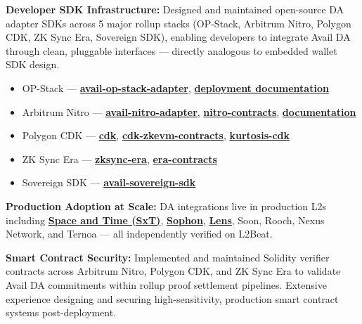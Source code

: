 \documentclass[letterpaper,11pt]{article}
\newcommand{\resumeItem}[1]{
  \item\small{
    {#1 \vspace{-2pt}}
  }
}
\begin{document}
    \resumeItem{\textbf{Developer SDK Infrastructure:} Designed and maintained open-source DA adapter SDKs across 5 major rollup stacks (OP-Stack, Arbitrum Nitro, Polygon CDK, ZK Sync Era, Sovereign SDK), enabling developers to integrate Avail DA through clean, pluggable interfaces — directly analogous to embedded wallet SDK design.
      \begin{itemize}
        \item OP-Stack --- \href{https://github.com/availproject/avail-op-stack-adapter/tree/avail-develop}{\textbf{avail-op-stack-adapter}}, \href{https://docs.availproject.org/docs/build-with-avail/deploy-rollup-on-avail/Optimium/op-stack/op-stack}{\textbf{deployment documentation}}
        \item Arbitrum Nitro --- \href{https://github.com/availproject/avail-nitro-adapter/tree/avail-nitro-node-v2-upstream-v3.2.1}{\textbf{avail-nitro-adapter}}, \href{https://github.com/availproject/nitro-contracts}{\textbf{nitro-contracts}}, \href{https://docs.availproject.org/docs/build-with-avail/deploy-rollup-on-avail/Optimium/arbitrum-nitro/nitro-stack}{\textbf{documentation}}
        \item Polygon CDK --- \href{https://github.com/availproject/cdk}{\textbf{cdk}}, \href{https://github.com/availproject/cdk-zkevm-contracts}{\textbf{cdk-zkevm-contracts}}, \href{https://github.com/availproject/kurtosis-cdk}{\textbf{kurtosis-cdk}}
        \item ZK Sync Era --- \href{https://github.com/availproject/zksync-era}{\textbf{zksync-era}}, \href{https://github.com/availproject/era-contracts}{\textbf{era-contracts}}
        \item Sovereign SDK --- \href{https://github.com/availproject/avail-sovereign-sdk/tree/avail-develop}{\textbf{avail-sovereign-sdk}}
      \end{itemize}
    }

    \resumeItem{\textbf{Production Adoption at Scale:} DA integrations live in production L2s including \href{https://l2beat.com/scaling/projects/sxt\#contracts}{\textbf{Space and Time (SxT)}}, \href{https://l2beat.com/scaling/projects/sophon}{\textbf{Sophon}}, \href{https://l2beat.com/scaling/projects/lens}{\textbf{Lens}}, Soon, Rooch, Nexus Network, and Ternoa --- all independently verified on L2Beat.}
    
    \resumeItem{\textbf{Smart Contract Security:} Implemented and maintained Solidity verifier contracts across Arbitrum Nitro, Polygon CDK, and ZK Sync Era to validate Avail DA commitments within rollup proof settlement pipelines. Extensive experience designing and securing high-sensitivity, production smart contract systems post-deployment.}
\end{document}
